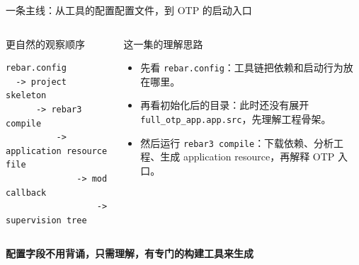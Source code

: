 \documentclass[aspectratio=169, 9pt]{beamer}
\newcommand{\warn}[1]{\textbf{\color{warning}#1}}
\newcommand{\code}[1]{\texttt{#1}}
\begin{document}
\begin{frame}[fragile]{一条主线：从工具的配置配置文件，到 OTP 的启动入口}
  \begin{columns}[T,onlytextwidth]
    \begin{block}{更自然的观察顺序}
\begin{lstlisting}
rebar.config
  -> project skeleton
      -> rebar3 compile
          -> application resource file
              -> mod callback
                  -> supervision tree
\end{lstlisting}
    \end{block}
    \footnotesize
    \begin{alertblock}{这一集的理解思路}
      \begin{itemize}
        \item 先看 \code{rebar.config}：工具链把依赖和启动行为放在哪里。
        \item 再看初始化后的目录：此时还没有展开 \code{full\_otp\_app.app.src}，先理解工程骨架。
        \item 然后运行 \code{rebar3 compile}：下载依赖、分析工程、生成 application resource，再解释 OTP 入口。
      \end{itemize}
    \end{alertblock}
  \end{columns}
  \vspace{0.2cm}
  \centering
  \warn{配置字段不用背诵，只需理解，有专门的构建工具来生成}
\end{frame}
\end{document}
